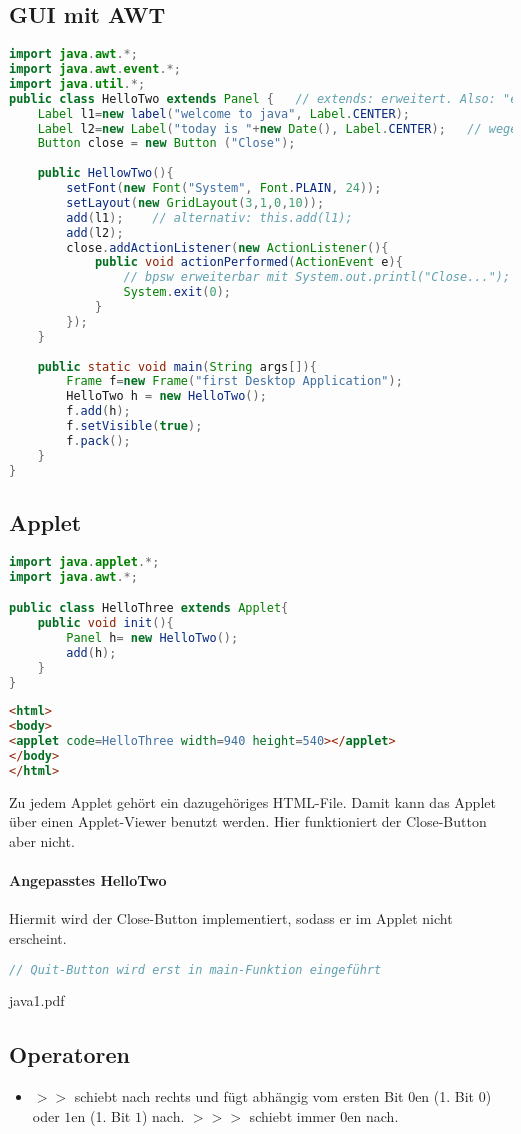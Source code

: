 \subsection{GUI mit AWT}
\begin{lstlisting}[language=Java]
import java.awt.*;
import java.awt.event.*;
import java.util.*;
public class HelloTwo extends Panel {	// extends: erweitert. Also: "erbt von"
	Label l1=new label("welcome to java", Label.CENTER);
	Label l2=new Label("today is "+new Date(), Label.CENTER);	// wegen import javo.util.* kann hier nur Date() geschrieben werden.
	Button close = new Button ("Close");
	
	public HellowTwo(){
		setFont(new Font("System", Font.PLAIN, 24));
		setLayout(new GridLayout(3,1,0,10));
		add(l1);	// alternativ: this.add(l1);
		add(l2);
		close.addActionListener(new ActionListener(){
			public void actionPerformed(ActionEvent e){
				// bpsw erweiterbar mit System.out.printl("Close...");
				System.exit(0);
			}
		});
	}
	
	public static void main(String args[]){
		Frame f=new Frame("first Desktop Application");
		HelloTwo h = new HelloTwo();
		f.add(h);
		f.setVisible(true);
		f.pack();
	}
}
\end{lstlisting}

\subsection{Applet}
\begin{lstlisting}[language=Java]
import java.applet.*;
import java.awt.*;

public class HelloThree extends Applet{
	public void init(){
		Panel h= new HelloTwo();
		add(h);
	}
}
\end{lstlisting}
\begin{lstlisting}[language=HTML]
<html>
<body>
<applet code=HelloThree width=940 height=540></applet>
</body>
</html>
\end{lstlisting}
Zu jedem Applet gehört ein dazugehöriges HTML-File. Damit kann das Applet über einen Applet-Viewer benutzt werden. Hier funktioniert der Close-Button aber nicht. 
\paragraph{Angepasstes HelloTwo} Hiermit wird der Close-Button implementiert, sodass er im Applet nicht erscheint.
\begin{lstlisting}[language=Java]
// Quit-Button wird erst in main-Funktion eingeführt
\end{lstlisting}
java1.pdf
\subsection{Operatoren}
\begin{itemize}
\item $>>$ schiebt nach rechts und fügt abhängig vom ersten Bit $0$en (1. Bit $0$) oder $1$en (1. Bit $1$) nach. $>>>$ schiebt immer $0$en nach.
\end{itemize}


\newpage
\printbibliography
